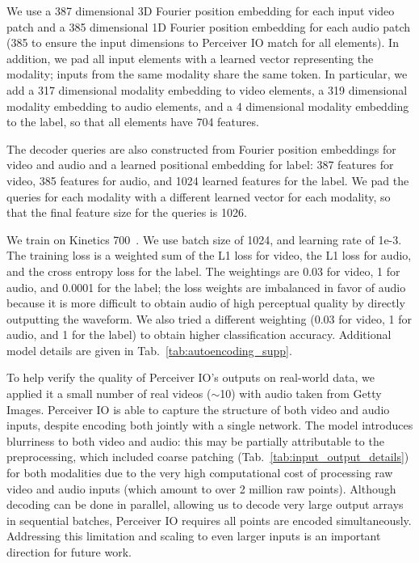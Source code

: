 \documentclass{article} %
\newcommand{\ourmodel}{Perceiver IO\xspace}
\begin{document}
We use a 387 dimensional 3D Fourier position embedding for each input video patch and a 385 dimensional 1D Fourier position embedding for each audio patch (385 to ensure the input dimensions to \ourmodel{} match for all elements).
In addition, we pad all input elements with a learned vector
representing the modality;
inputs from the same modality share the same token.
In particular,
we add a 317 dimensional modality embedding to video elements,
a 319 dimensional modality embedding to audio elements,
and a 4 dimensional modality embedding to the label,
so that all elements have 704 features.

The decoder queries are also constructed from Fourier position embeddings for video and audio and a learned positional embedding for label:
387 features for video,
385 features for audio,
and 1024 learned features for the label.
We pad the queries for each modality with a different learned vector for each modality,
so that the final feature size for the queries is 1026.

We train on Kinetics 700~\citep{smaira2020short}. We use batch size of 1024, and learning rate of 1e-3. The training loss is a weighted sum of the L1 loss for video, the L1 loss for audio, and the cross entropy loss for the label. The weightings are 0.03 for video, 1 for audio, and 0.0001 for the label; the loss weights are imbalanced in favor of audio because it is more difficult to obtain
audio of high perceptual quality by directly outputting the waveform.
We also tried a different weighting (0.03 for video, 1 for audio, and 1 for the label) to obtain higher classification accuracy. Additional model details are given in Tab.~\ref{tab:autoencoding_supp}.

To help verify the quality of \ourmodel{}'s outputs on real-world data, we applied it a small number of real videos ($\sim$10) with audio taken from Getty Images. \ourmodel{} is able to capture the structure of both video and audio inputs, despite encoding both jointly with a single network. The model introduces blurriness to both video and audio: this may be partially attributable to the preprocessing, which included coarse patching (Tab.~\ref{tab:input_output_details}) for both modalities due to the very high computational cost of processing raw video and audio inputs (which amount to over 2 million raw points). Although decoding can be done in parallel, allowing us to decode very large output arrays in sequential batches, \ourmodel{} requires all points are encoded simultaneously. Addressing this limitation and scaling to even larger inputs is an important direction for future work.
\end{document}

